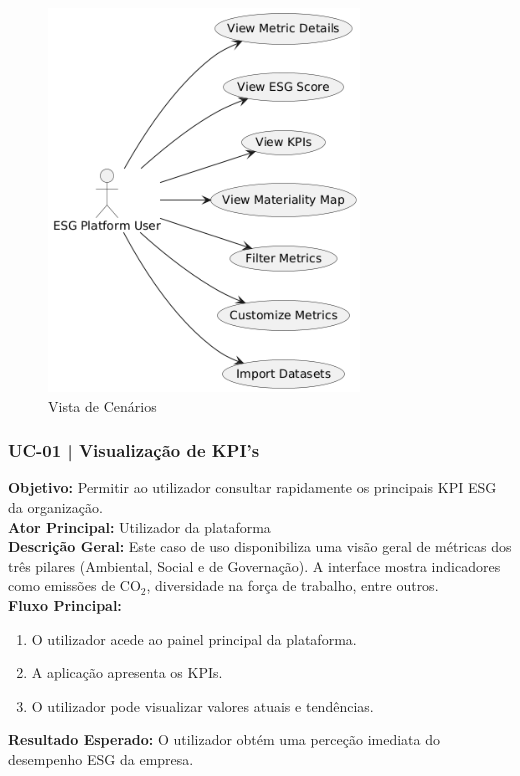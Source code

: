\begin{figure}[H]
    \centering
    \includegraphics[height=4in,keepaspectratio]{frontmatter/assets/diagrams/Scenario View/Scenario_View.png}
    \caption{Vista de Cenários}
    \label{fig:scenario_view}
\end{figure}

\subsubsection{UC-01 | Visualização de KPI's}

\textbf{Objetivo:} Permitir ao utilizador consultar rapidamente os principais \gls{KPI} ESG da organização. \\
\textbf{Ator Principal:} Utilizador da plataforma \\
\textbf{Descrição Geral:} Este caso de uso disponibiliza uma visão geral de métricas dos três pilares (Ambiental, Social e de Governação). A interface mostra indicadores como emissões de CO$_2$, diversidade na força de trabalho, entre outros. \\
\textbf{Fluxo Principal:}
\begin{enumerate}
    \item O utilizador acede ao painel principal da plataforma.
    \item A aplicação apresenta os KPIs.
    \item O utilizador pode visualizar valores atuais e tendências.
\end{enumerate}
\textbf{Resultado Esperado:} O utilizador obtém uma perceção imediata do desempenho ESG da empresa.

